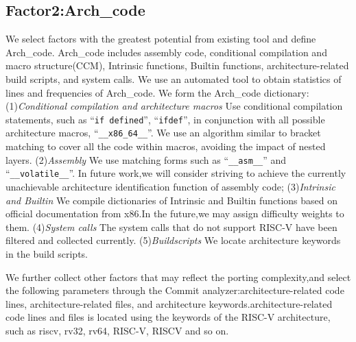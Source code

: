 \documentclass[sigconf,screen,review,anonymous]{acmart}
\begin{document}
\subsection{Factor2:Arch\_code}

We select factors with the greatest potential from existing tool and define Arch\_code.
Arch\_code includes assembly code, conditional compilation and macro structure(CCM), Intrinsic functions, Builtin functions, architecture-related build scripts, and system calls.
We use an automated tool to obtain statistics of lines and frequencies of Arch\_code.
We form the Arch\_code dictionary:
(1)\textit{Conditional compilation and architecture macros} Use conditional compilation statements, such as ``\texttt{if defined}'', ``\texttt{ifdef}'', in conjunction with all possible architecture macros,
  ``\texttt{\_\_x86\_64\_\_}''.
  We use an algorithm similar to bracket matching to cover all the code within macros, avoiding the impact of nested layers.
  (2)\textit{Assembly} We use matching forms such as ``\texttt{\_\_asm\_\_}'' and ``\texttt{\_\_volatile\_\_}''.
  In future work,we will consider striving to achieve the currently unachievable architecture identification function of assembly code;
  (3)\textit{Intrinsic and Builtin} 
  We compile dictionaries of Intrinsic and Builtin functions based on official documentation from x86\cite{x86intrin}.In the future,we may assign difficulty weights to them.
  (4)\textit{System calls} The system calls that do not support RISC-V have been filtered and collected currently.
  (5)\textit{Buildscripts} We locate architecture keywords in the build scripts.


We further collect other factors that may reflect the porting complexity,and select the following parameters through the Commit analyzer:architecture-related code lines, architecture-related files, and architecture keywords.architecture-related code lines and files is located using the keywords of the RISC-V architecture, such as riscv, rv32, rv64, RISC-V, RISCV and so on.
\end{document}
